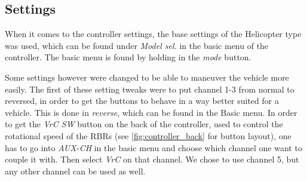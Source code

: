 \subsection{Settings}
When it comes to the controller settings, the base settings of the Helicopter type was used, which can be found under \textit{Model sel.} in the basic
menu of the controller. The basic menu is found by holding in the \textit{mode}
button.

Some settings however were changed to be able to maneuver the vehicle
more easily. The first of these setting tweaks were to put channel 1-3 from
normal to reversed, in order to get the buttons to behave in a way better
suited for a vehicle. This is done in \textit{reverse}, which can be found in the
Basic menu. In order to get the \textit{VrC SW} button on the back of the
controller, used to control the rotational speed of the RBRs (see
\cref{fig:controller_back} for button layout), one has to go into
\textit{AUX-CH} in the basic menu and choose which channel  one want to couple
it with. Then select \textit{VrC} on that channel. We chose to use channel 5,
but any other channel can be used as well.
